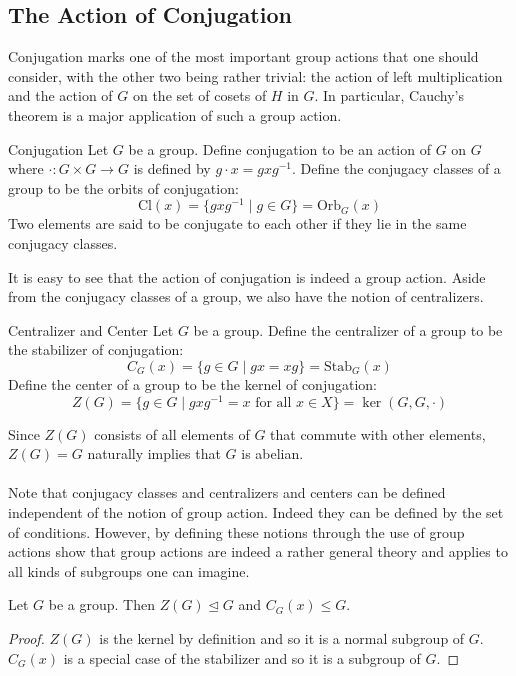 \documentclass[a4paper]{article}
\begin{document}
\subsection{The Action of Conjugation}
Conjugation marks one of the most important group actions that one should consider, with the other two being rather trivial: the action of left multiplication and the action of $G$ on the set of cosets of $H$ in $G$. In particular, Cauchy's theorem is a major application of such a group action. 

\begin{defn}{Conjugation}{} Let $G$ be a group. Define conjugation to be an action of $G$ on $G$ where $\cdot:G\times G\to G$ is defined by $g\cdot x=gxg^{-1}$. Define the conjugacy classes of a group to be the orbits of conjugation: $$\text{Cl}(x)=\{gxg^{-1}\;|\;g\in G\}=\text{Orb}_G(x)$$ Two elements are said to be conjugate to each other if they lie in the same conjugacy classes. 
\end{defn}

It is easy to see that the action of conjugation is indeed a group action. Aside from the conjugacy classes of a group, we also have the notion of centralizers. 

\begin{defn}{Centralizer and Center}{} Let $G$ be a group. Define the centralizer of a group to be the stabilizer of conjugation: $$C_G(x)=\{g\in G\;|\;gx=xg\}=\text{Stab}_G(x)$$ Define the center of a group to be the kernel of conjugation: $$Z(G)=\{g\in G\;|\;gxg^{-1}=x\text{ for all }x\in X\}=\ker(G,G,\cdot)$$
\end{defn}

Since $Z(G)$ consists of all elements of $G$ that commute with other elements,  $Z(G)=G$ naturally implies that $G$ is abelian. \\~\\

Note that conjugacy classes and centralizers and centers can be defined independent of the notion of group action. Indeed they can be defined by the set of conditions. However, by defining these notions through the use of group actions show that group actions are indeed a rather general theory and applies to all kinds of subgroups one can imagine. 

\begin{lmm}{}{} Let $G$ be a group. Then $Z(G)\trianglelefteq G$ and $C_G(x)\leq G$. \tcbline
\begin{proof}
$Z(G)$ is the kernel by definition and so it is a normal subgroup of $G$. $C_G(x)$ is a special case of the stabilizer and so it is a subgroup of $G$. 
\end{proof}
\end{lmm}
\end{document}
